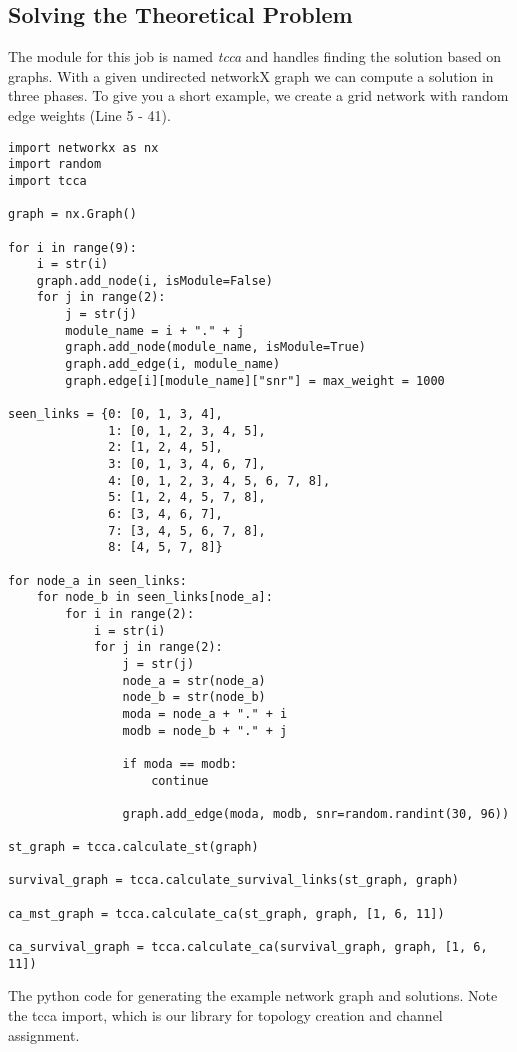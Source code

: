   \subsection{Solving the Theoretical Problem}
    The module for this job is named \textit{tcca} and handles finding the solution based on graphs.
    With a given undirected networkX graph we can compute a solution in three phases.
    To give you a short example, we create a grid network with random edge weights (Line 5 - 41).
    \begin{table}
      \begin{lstlisting}
import networkx as nx
import random
import tcca

graph = nx.Graph()

for i in range(9):
    i = str(i)
    graph.add_node(i, isModule=False)
    for j in range(2):
        j = str(j)
        module_name = i + "." + j
        graph.add_node(module_name, isModule=True)
        graph.add_edge(i, module_name)
        graph.edge[i][module_name]["snr"] = max_weight = 1000

seen_links = {0: [0, 1, 3, 4], 
              1: [0, 1, 2, 3, 4, 5], 
              2: [1, 2, 4, 5], 
              3: [0, 1, 3, 4, 6, 7], 
              4: [0, 1, 2, 3, 4, 5, 6, 7, 8], 
              5: [1, 2, 4, 5, 7, 8], 
              6: [3, 4, 6, 7], 
              7: [3, 4, 5, 6, 7, 8], 
              8: [4, 5, 7, 8]}

for node_a in seen_links:
    for node_b in seen_links[node_a]:
        for i in range(2):
            i = str(i)
            for j in range(2):
                j = str(j)
                node_a = str(node_a)
                node_b = str(node_b)
                moda = node_a + "." + i
                modb = node_b + "." + j

                if moda == modb:
                    continue

                graph.add_edge(moda, modb, snr=random.randint(30, 96))

st_graph = tcca.calculate_st(graph)

survival_graph = tcca.calculate_survival_links(st_graph, graph)

ca_mst_graph = tcca.calculate_ca(st_graph, graph, [1, 6, 11])

ca_survival_graph = tcca.calculate_ca(survival_graph, graph, [1, 6, 11])
      \end{lstlisting}
      \caption{The python code for generating the example network graph and solutions. Note the tcca import, 
      which is our library for topology creation and channel assignment.}
    \end{table}
    
